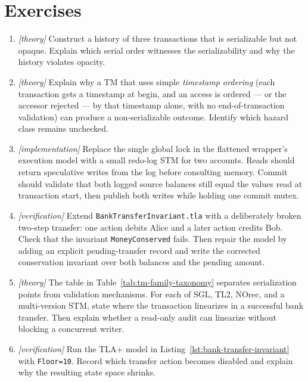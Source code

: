 \section{Exercises}

\begin{enumerate}
\item \emph{[theory]} Construct a history of three transactions that is
serializable but not opaque. Explain which serial order witnesses the
serializability and why the history violates opacity.

\item \emph{[theory]} Explain why a TM that uses simple \emph{timestamp
ordering} (each transaction gets a timestamp at begin, and an access is
ordered --- or the accessor rejected --- by that timestamp alone, with no
end-of-transaction validation) can produce a non-serializable outcome. Identify
which hazard class remains unchecked.

\item \emph{[implementation]} Replace the single global lock in the
flattened wrapper's execution model with a small redo-log STM for two
accounts. Reads should return speculative writes from the log before
consulting memory. Commit should validate that both logged source
balances still equal the values read at transaction start, then publish
both writes while holding one commit mutex.

\item \emph{[verification]} Extend \texttt{BankTransferInvariant.tla} with a
deliberately broken two-step transfer: one action debits Alice and a
later action credits Bob. Check that the invariant
\texttt{MoneyConserved} fails. Then repair the model by adding an
explicit pending-transfer record and write the corrected conservation
invariant over both balances and the pending amount.

\item \emph{[theory]} The table in Table~\ref{tab:tm-family-taxonomy}
separates serialization points from validation mechanisms. For each of
SGL, TL2, NOrec, and a multi-version STM, state where the transaction
linearizes in a successful bank transfer. Then explain whether a
read-only audit can linearize without blocking a concurrent writer.

\item \emph{[verification]} Run the TLA+ model in
Listing~\ref{lst:bank-transfer-invariant} with \texttt{Floor=10}.
Record which transfer action becomes disabled and explain why the
resulting state space shrinks.


\end{enumerate}
